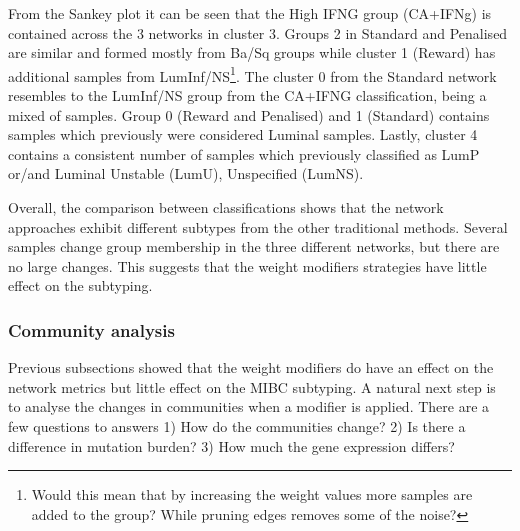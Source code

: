 From the Sankey plot it can be seen that the High IFNG group (CA+IFNg) is contained across the 3 networks in cluster 3. Groups 2 in Standard and Penalised are similar and formed mostly from Ba/Sq groups while cluster 1 (Reward) has additional samples from LumInf/NS\footnote{Would this mean that by increasing the weight values more samples are added to the group? While pruning edges removes some of the noise?}. The cluster 0 from the Standard network resembles to the LumInf/NS group from the CA+IFNG classification, being a mixed of samples. Group 0 (Reward and Penalised) and 1 (Standard) contains samples which previously were considered Luminal samples. Lastly, cluster 4 contains a consistent number of samples which previously classified as LumP or/and Luminal Unstable (LumU), Unspecified (LumNS).

Overall, the comparison between classifications shows that the network approaches exhibit different subtypes from the other traditional methods. Several samples change group membership in the three different networks, but there are no large changes. This suggests that the weight modifiers strategies have little effect on the subtyping.

\subsubsection{Community analysis}

Previous subsections showed that the weight modifiers do have an effect on the network metrics but little effect on the MIBC subtyping. A natural next step is to analyse the changes in communities when a modifier is applied. There are a few questions to answers 1) How do the communities change? 2) Is there a difference in mutation burden? 3) How much the gene expression differs? 

